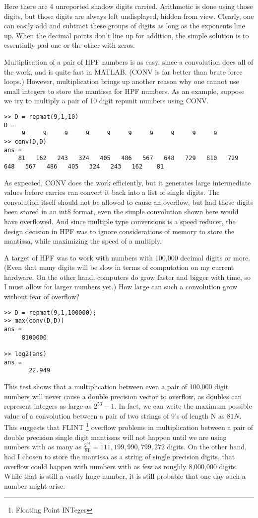 \documentclass[a4paper,12pt]{article}
\begin{document}
Here there are 4 unreported shadow digits carried. Arithmetic is done using those digits, but those digits are always left undisplayed, hidden from view. Clearly, one can easily add and subtract these groups of digits as long as the exponents line up. When the decimal points don't line up for addition, the simple solution is to essentially pad one or the other with zeros.

Multiplication of a pair of HPF numbers is as easy, since a convolution does all of the work, and is quite fast in MATLAB. (CONV is far better than brute force loops.) However, multiplication brings up another reason why one cannot use small integers to store the mantissa for HPF numbers. As an example, suppose we try to multiply a pair of 10 digit repunit numbers using CONV.

\newpage
\begin{lstlisting}
>> D = repmat(9,1,10)
D =
     9     9     9     9     9     9     9     9     9     9
>> conv(D,D)
ans =
    81   162   243   324   405   486   567   648   729   810   729   648   567   486   405   324   243   162    81
\end{lstlisting}

As expected, CONV does the work efficiently, but it generates large intermediate values before carries can convert it back into a list of single digits. The convolution itself should not be allowed to cause an overflow, but had those digits been stored in an int8 format, even the simple convolution shown here would have overflowed. And since multiple type conversions is a speed reducer, the design decision in HPF was to ignore considerations of memory to store the mantissa, while maximizing the speed of a multiply.

A target of HPF was to work with numbers with 100,000 decimal digits or more. (Even that many digits will be slow in terms of computation on my current hardware. On the other hand, computers do grow faster and bigger with time, so I must allow for larger numbers yet.) How large can such a convolution grow without fear of overflow?

\begin{lstlisting}
>> D = repmat(9,1,100000);
>> max(conv(D,D))
ans =
     8100000

>> log2(ans)
ans =
       22.949
\end{lstlisting}

This test shows that a multiplication between even a pair of 100,000 digit numbers will never cause a double precision vector to overflow, as doubles can represent integers as large as $2^{53} - 1$. In fact, we can write the maximum possible value of a convolution between a pair of two strings of 9's of length N as $81N$. This suggests that FLINT \footnote{Floating Point INTeger} overflow problems in multiplication between a pair of double precision single digit mantissas will not happen until we are using numbers with as many as $\frac{2^{53}}{81}=111,199,990,799,272$ digits. On the other hand, had I chosen to store the mantissa as a string of single precision digits, that overflow could happen with numbers with as few as roughly 8,000,000 digits. While that is still a vastly huge number, it is still probable that one day such a number might arise.
\end{document}
